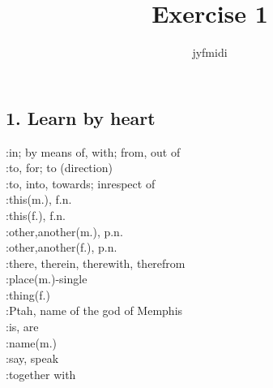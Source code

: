 \documentclass{article}
\title{Exercise 1}
\author{jyfmidi}
\begin{document}
\Large
\maketitle
\begin{spacing}{1.7}
\section*{1. Learn by heart}
  :in; by means of, with; from, out of\\
  :to, for; to (direction)\\
  :to, into, towards; inrespect of\\
  :this(m.), f.n.\\
  :this(f.), f.n.\\
  :other,another(m.), p.n.\\
  :other,another(f.), p.n.\\
  :there, therein, therewith, therefrom\\
  :place(m.)-single\\
  :thing(f.)\\
  :Ptah, name of the god of Memphis\\
  :is, are\\
  :name(m.)\\
  :say, speak\\
  :together with\\


\end{spacing}
\end{document}
